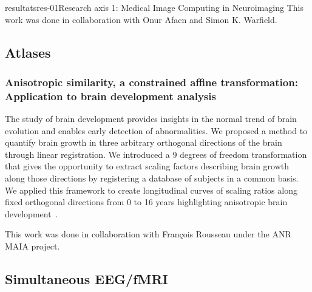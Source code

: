 \documentclass{ra2018}
\begin{document}
\begin{module}{resultats}{res-01}{Research axis 1: Medical Image Computing in Neuroimaging}
This work was done in collaboration with Onur Afacn and Simon K. Warfield.

\subsection{Atlases}
\subsubsection{Anisotropic similarity, a constrained affine transformation: Application to brain development analysis}
\begin{participants}
\end{participants}
The study of brain development provides insights in the normal trend of brain evolution and enables early detection of abnormalities. We proposed a method to quantify brain growth in three arbitrary orthogonal directions of the brain through linear registration. We introduced a 9 degrees of freedom transformation that gives the opportunity to extract scaling factors describing brain growth along those directions by registering a database of subjects in a common basis. We applied this framework to create longitudinal curves of scaling ratios along fixed orthogonal directions from 0 to 16 years highlighting anisotropic brain development~\cite{legouhy:inserm-01871274}.

This work was done in collaboration with François Rousseau under the ANR MAIA project.

\subsection{Simultaneous EEG/fMRI}


\end{module}
\end{document}
